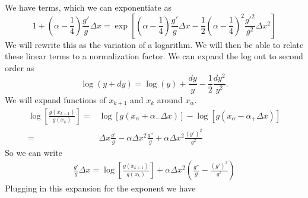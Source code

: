 We have terms, which we can exponentiate as 
\begin{equation}
1 + \left(\alpha-\frac{1}{4}\right)\frac{g'}{g}\Delta x = \exp\left[\left(\alpha - \frac{1}{4}\right)\frac{g'}{g}\Delta x-\frac{1}{2}\left(\alpha-\frac{1}{4}\right)^2\frac{g'^2}{g^2}\Delta x^2\right]
\end{equation}
We will rewrite this as the variation of a logarithm.  We will then be able to relate these linear terms to a normalization factor.  We can expand the log out to second order as 
\begin{equation}
\log(y +dy) = \log(y) +\frac{dy}{y} - \frac{1}{2}\frac{dy^2}{y^2}.
\end{equation}
We will expand functions of $x_{k+1}$ and $x_k$ around  $x_\alpha$.  
\begin{align}
\log\left[\frac{g(x_{k+1})}{g(x_k)}\right] =& \log[g(x_\alpha+\alpha_-\Delta x)] - \log[ g(x_\alpha -\alpha_+\Delta x)]\\
=&   \Delta x \frac{g'}{g} -\alpha\Delta x^2\frac{g''}{g} + \alpha\Delta x^2\frac{(g')^2}{g^2}
\end{align}
So we can write 
\begin{align}
\frac{g'}{g}\Delta x = \log\left[\frac{g(x_{k+1})}{g(x_k)}\right]  +\alpha\Delta x^2\left(\frac{g''}{g} -\frac{(g')^2}{g^2}\right)\label{eq:velocity_log}
\end{align}
Plugging in this expansion for the exponent we have

